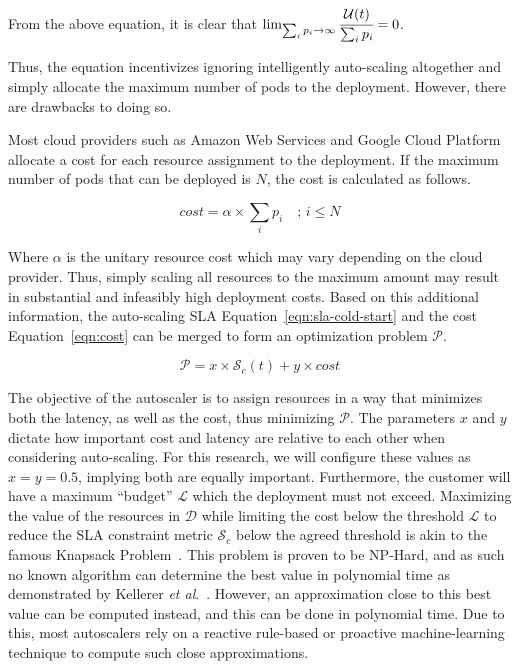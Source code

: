 From the above equation, it is clear that $\lim_{\sum_{i} p_{i} \to \infty} \cfrac{\mathcal{U}(t)}{\sum_{i} p_{i}} = 0$.


Thus, the equation incentivizes ignoring intelligently auto-scaling altogether and simply allocate the maximum number of pods to the deployment. However, there are drawbacks to doing so.\par

Most cloud providers such as Amazon Web Services and Google Cloud Platform allocate a cost for each resource assignment to the deployment. If the maximum number of pods that can be deployed is $N$, the cost is calculated as follows.

\begin{equation}
    cost = \alpha \times \sum_{i} p_{i} \quad ;\,i \le N
    \label{eqn:cost}
\end{equation}

Where $\alpha$ is the unitary resource cost which may vary depending on the cloud provider. Thus, simply scaling all resources to the maximum amount may result in substantial and infeasibly high deployment costs. Based on this additional information, the auto-scaling SLA Equation~\ref{eqn:sla-cold-start} and the cost Equation~\ref{eqn:cost} can be merged to form an optimization problem $\mathcal{P}$.

\begin{equation}
    \mathcal{P} = x \times \mathcal{S}_{c}(t) + y \times cost
    \label{eqn:optimization-problem}
\end{equation}

The objective of the autoscaler is to assign resources in a way that minimizes both the latency, as well as the cost, thus minimizing $\mathcal{P}$. The parameters $x$ and $y$ dictate how important cost and latency are relative to each other when considering auto-scaling. For this research, we will configure these values as $x = y = 0.5$, implying both are equally important. Furthermore, the customer will have a maximum ``budget'' $\mathcal{L}$ which the deployment must not exceed. Maximizing the value of the resources in $\mathcal{D}$ while limiting the cost below the threshold $\mathcal{L}$ to reduce the SLA constraint metric $\mathcal{S}_{c}$ below the agreed threshold is akin to the famous Knapsack Problem~\cite{martello1987algorithms}. This problem is proven to be NP-Hard, and as such no known algorithm can determine the best value in polynomial time as demonstrated by Kellerer \textit{et al}.~\cite{kellerer2004introduction}. However, an approximation close to this best value can be computed instead, and this can be done in polynomial time. Due to this, most autoscalers rely on a reactive rule-based or proactive machine-learning technique to compute such close approximations.\par

